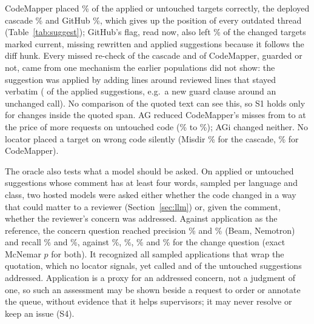 CodeMapper placed \wkCmQPlace\% of the applied or untouched targets correctly, the deployed cascade \wkDepPlace\% and GitHub \wkGhPlace\%, which gives up the position of every outdated thread (Table~\ref{tab:suggest}); GitHub's flag, read now, also left \wkGhMiss\% of the changed targets marked current, missing rewritten and applied suggestions because it follows the diff hunk. Every missed re-check of the cascade and of CodeMapper, guarded or not, came from one mechanism the earlier populations did not show: the suggestion was applied by adding lines around reviewed lines that stayed verbatim (\wkAppliedWrap{} of the \wkClsApplied{} applied suggestions, e.g.\ a new guard clause around an unchanged call). No comparison of the quoted text can see this, so S1 holds only for changes inside the quoted span. AG reduced CodeMapper's misses from \wkCmQMissK{} to \wkCmAgMissK{} at the price of more requests on untouched code (\wkCmQExtra\% to \wkCmAgExtra\%); AGi changed neither. No locator placed a target on wrong code silently (Misdir \wkDepMisdir\% for the cascade, \wkCmQMisdir\% for CodeMapper).

The oracle also tests what a model should be asked. On \wkLlmN{} applied or untouched suggestions whose comment has at least four words, sampled per language and class, two hosted models were asked either whether the code changed in a way that could matter to a reviewer (Section~\ref{sec:llm}) or, given the comment, whether the reviewer's concern was addressed. Against application as the reference, the concern question reached precision \wkBeamClaimPrecision\% and \wkNemoClaimPrecision\% (Beam, Nemotron) and recall \wkBeamClaimRecall\% and \wkNemoClaimRecall\%, against \wkBeamDiffPrecision\%, \wkNemoDiffPrecision\%, \wkBeamDiffRecall\% and \wkNemoDiffRecall\% for the change question (exact McNemar $p$ \wkBeamMcNemarP{} for both). It recognized all \wkBeamWrapN{} sampled applications that wrap the quotation, which no locator signals, yet called \wkBeamClaimFP{} and \wkNemoClaimFP{} of the \wkLlmUntouched{} untouched suggestions addressed. Application is a proxy for an addressed concern, not a judgment of one, so such an assessment may be shown beside a request to order or annotate the queue, without evidence that it helps supervisors; it may never resolve or keep an issue (S4).

